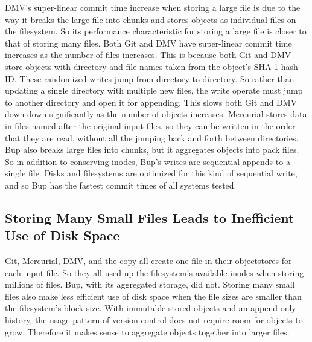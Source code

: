 DMV's super-linear commit time increase when storing a large file is due to the way it breaks the large file into chunks and stores objects as individual files on the filesystem.
So its performance characteristic for storing a large file is closer to that of storing many files.
Both Git and DMV have super-linear commit time increases as the number of files increases.
This is because both Git and DMV store objects with directory and file names taken from the object's SHA-1 hash ID.
These randomized writes jump from directory to directory.
So rather than updating a single directory with multiple new files, the write operate must jump to another directory and open it for appending.
This slows both Git and DMV down down significantly as the number of objects increases.
Mercurial stores data in files named after the original input files, so they can be written in the order that they are read, without all the jumping back and forth between directories.
Bup also breaks large files into chunks, but it aggregates objects into pack files.
So in addition to conserving inodes, Bup's writes are sequential appends to a single file.
Disks and filesystems are optimized for this kind of sequential write, and so Bup has the fastest commit times of all systems tested.


\subsection{Storing Many Small Files Leads to Inefficient Use of Disk Space}

Git, Mercurial, DMV, and the copy all create one file in their \glspl{objectstore} for each input file.
So they all used up the filesystem's available inodes when storing millions of files.
Bup, with its aggregated storage, did not.
Storing many small files also make less efficient use of disk space when the file sizes are smaller than the filesystem's block size.
With immutable stored objects and an append-only history, the usage pattern of version control does not require room for objects to grow.
Therefore it makes sense to aggregate objects together into larger files.

%
